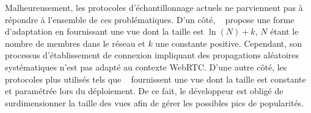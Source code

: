 





Malheureusement, les protocoles d'échantillonnage actuels ne parviennent pas à
répondre à l'ensemble de ces problématiques. D'un côté,
\SCAMP~\cite{ganesh2001scamp, ganesh2003peer} propose une forme d'adaptation en
fournissant une vue dont la taille est $\ln (N) + k$, $N$ étant le nombre de
membres dans le réseau et $k$ une constante positive. Cependant, son processus
d'établissement de connexion impliquant des propagations aléatoires
systématiques n'est pas adapté au contexte WebRTC. D'une autre côté, les
protocoles plus utilisés tels que \CYCLON~\cite{voulgaris2005cyclon} fournissent
une vue dont la taille est constante et paramétrée lors du déploiement. De ce
fait, le développeur est obligé de surdimensionner la taille des vues afin de
gérer les possibles pics de popularités.



